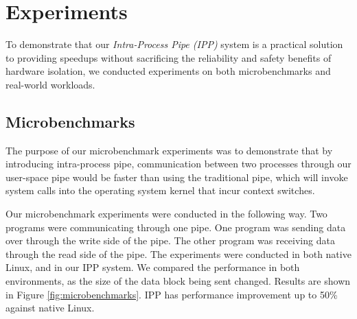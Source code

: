\section{Experiments}
\label{sec:experiments}

To demonstrate that our \emph{Intra-Process Pipe (IPP)} system is a practical solution to 
providing speedups without sacrificing the reliability and safety benefits of hardware isolation, 
we conducted experiments on both microbenchmarks and real-world workloads. 


\subsection{Microbenchmarks}
\label{experiments.microbenchmarks}

The purpose of our microbenchmark experiments was to demonstrate that by introducing intra-process pipe, 
communication between two processes through our user-space pipe would be faster than using the traditional 
pipe, which will invoke system calls into the operating system kernel that incur context switches. 

Our microbenchmark experiments were conducted in the following way. 
Two programs were communicating through one pipe. One program was sending data over through the write side of the pipe. 
The other program was receiving data through the read side of the pipe. 
The experiments were conducted in both native Linux, and in our IPP system. 
We compared the performance in both environments, as the size of the data block being sent changed. 
Results are shown in Figure \ref{fig:microbenchmarks}. 
IPP has performance improvement up to 50\% against native Linux.  

